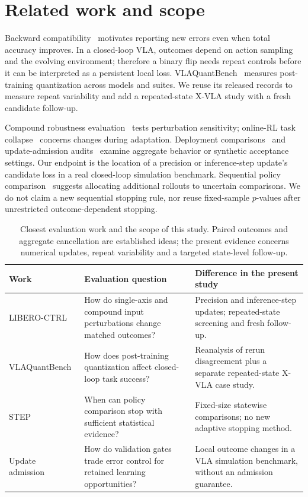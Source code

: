 \documentclass{article}
\begin{document}
\section{Related work and scope}
Backward compatibility~\citep{bansal2019updates,srivastava2020compat,yan2021pcr}
motivates reporting new errors even when total accuracy improves. In a closed-loop VLA,
outcomes depend on action sampling and the evolving environment; therefore a binary
flip needs repeat controls before it can be interpreted as a persistent local loss.
VLAQuantBench~\citep{xu2026vlaquantbench} measures post-training quantization across
models and suites. We reuse its released records to measure repeat variability and
add a repeated-state X-VLA study with a fresh candidate follow-up.

Compound robustness evaluation~\citep{sawada2026paired} tests perturbation sensitivity;
online-RL task collapse~\citep{yardimci2026collapse} concerns changes during adaptation.
Deployment comparisons~\citep{islam2026onnx} and update-admission
audits~\citep{ma2026admission} examine aggregate behavior or synthetic acceptance
settings. Our endpoint is the location of a precision or inference-step update's
candidate loss in a real closed-loop simulation benchmark.
Sequential policy comparison~\citep{snyder2025step} suggests allocating additional
rollouts to uncertain comparisons. We do not claim a new sequential stopping rule,
nor reuse fixed-sample $p$-values after unrestricted outcome-dependent stopping.

\newpage
\begin{table}[!ht]
  \centering
  \small
  \caption{Closest evaluation work and the scope of this study. Paired outcomes and
  aggregate cancellation are established ideas; the present evidence concerns
  numerical updates, repeat variability and a targeted state-level follow-up.}
  \label{tab:scope}
  \setlength{\tabcolsep}{4pt}
  \begin{tabular}{p{.23\linewidth}p{.33\linewidth}p{.36\linewidth}}
    \toprule
    Work & Evaluation question & Difference in the present study\\
    \midrule
    LIBERO-CTRL~\citep{sawada2026paired}
      & How do single-axis and compound input perturbations change matched outcomes?
      & Precision and inference-step updates; repeated-state screening and fresh follow-up.\\
    VLAQuantBench~\citep{xu2026vlaquantbench}
      & How does post-training quantization affect closed-loop task success?
      & Reanalysis of rerun disagreement plus a separate repeated-state X-VLA case study.\\
    STEP~\citep{snyder2025step}
      & When can policy comparison stop with sufficient statistical evidence?
      & Fixed-size statewise comparisons; no new adaptive stopping method.\\
    Update admission~\citep{ma2026admission}
      & How do validation gates trade error control for retained learning opportunities?
      & Local outcome changes in a VLA simulation benchmark, without an admission guarantee.\\
    \bottomrule
  \end{tabular}
\end{table}
\end{document}
